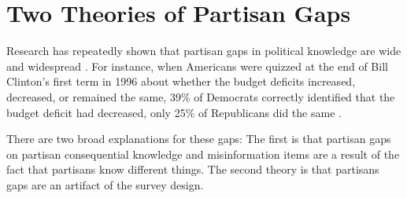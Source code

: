 \documentclass[12pt, letterpaper]{article}
\begin{document}
\newpage

\section*{Two Theories of Partisan Gaps}

Research has repeatedly shown that partisan gaps in political knowledge are wide and widespread \citep{bartels_2002, jerit2012partisan, lodgetaber_2013}. For instance, when Americans were quizzed at the end of Bill Clinton's first term in 1996 about whether the budget deficits increased, decreased, or remained the same, 39\% of Democrats correctly identified that the budget deficit had decreased, only 25\% of Republicans did the same \citep[280]{achen2016democracy}.


There are two broad explanations for these gaps: The first is that partisan gaps on partisan consequential knowledge and misinformation items are a result of the fact that partisans know different things. The second theory is that partisans gaps are an artifact of the survey design.



\end{document}
